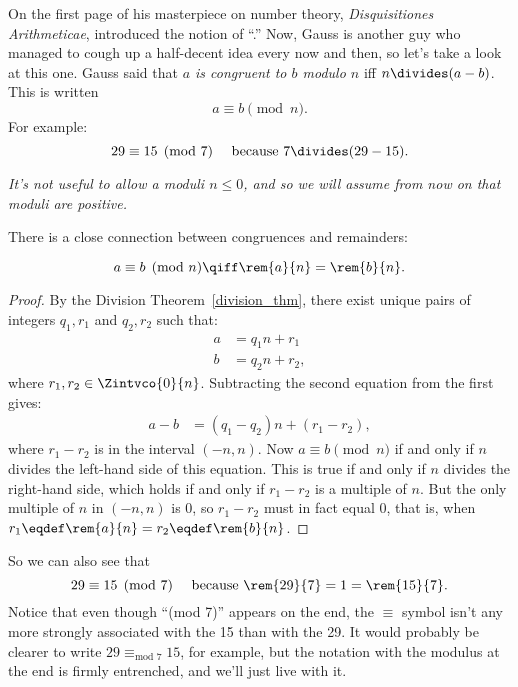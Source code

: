 On the first page of his masterpiece on number theory,
\emph{Disquisitiones Arithmeticae},  introduced the notion
of ``.''  Now, 
Gauss is another guy who managed to
cough up a half-decent idea every now and then, so let's take a look
at this one.  Gauss said that \emph{$a$ is congruent to $b$
  modulo $n$} iff $n \divides (a - b)$.
This is written
\[
a \equiv b \pmod{n}.
\]
For example:
\[
29 \equiv 15 \pmod{7} \quad\text{ because } 7 \divides (29 - 15).
\]

\emph{It's not useful to allow a moduli $n \leq 0$, and so we will
  assume from now on that moduli are positive.}

There is a close connection between congruences and remainders:
\begin{lemma}[Remainder]\label{lem:conrem}
\[
a \equiv b \pmod{n} \qiff \rem{a}{n} = \rem{b}{n}.
\]
\end{lemma}

\begin{proof}
By the Division Theorem~\ref{division_thm}, there exist unique pairs
of integers $q_1, r_1$ and $q_2, r_2$ such that:
\begin{align*}
a & = q_1 n + r_1\\
b & = q_2 n + r_2,
\end{align*}
where $r_1,r_2 \in \Zintvco{0}{n}$.  Subtracting the second equation from the
  first gives:
\begin{align*}
a - b & = (q_1 - q_2) n + (r_1 - r_2),
\end{align*}
where $r_1 - r_2$ is in the interval $(-n,n)$.  Now $a \equiv b
\pmod{n}$ if and only if $n$ divides the left-hand side of this equation.
This is true if and only if $n$ divides the right-hand side, which holds if
and only if $r_1 - r_2$ is a multiple of $n$.  But the only multiple
of $n$ in $(-n,n)$ is 0, so $r_1 - r_2$ must in fact equal 0, that is,
when $r_1 \eqdef \rem{a}{n} = r_2 \eqdef \rem{b}{n}$.
\end{proof}

So we can also see that
\[
29 \equiv 15 \pmod{7} \quad\text{ because } \rem{29}{7} = 1 =
\rem{15}{7}.
\]
Notice that even though ``(mod 7)'' appears on the end, the $\equiv$
symbol isn't any more strongly associated with the 15 than with the
29.  It would probably be clearer to write $29 \equiv_{\text{mod } 7}
15$, for example, but the notation with the modulus at the end is
firmly entrenched, and we'll just live with it.


